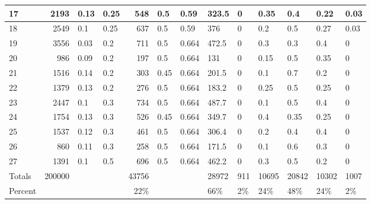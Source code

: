 \documentclass[12pt]{article}
\begin{document}
\begin{table}[H]
\begin{tabular}{ | l | r | l | l | r | l | l | l | l |l | l | l | l | }
17&2193&0.13&0.25&548&0.5&0.59&323.5&0&0.35&0.4&0.22&0.03 \\ \hline
18&2549&0.1&0.25&637&0.5&0.59&376&0&0.2&0.5&0.27&0.03 \\ \hline
19&3556&0.03&0.2&711&0.5&0.664&472.5&0&0.3&0.3&0.4&0 \\ \hline
20&986&0.09&0.2&197&0.5&0.664&131&0&0.15&0.5&0.35&0 \\ \hline
21&1516&0.14&0.2&303&0.45&0.664&201.5&0&0.1&0.7&0.2&0 \\ \hline
22&1379&0.13&0.2&276&0.5&0.664&183.2&0&0.25&0.5&0.25&0 \\ \hline
23&2447&0.1&0.3&734&0.5&0.664&487.7&0&0.1&0.5&0.4&0 \\ \hline
24&1754&0.13&0.3&526&0.45&0.664&349.7&0&0.4&0.35&0.25&0 \\ \hline
25&1537&0.12&0.3&461&0.5&0.664&306.4&0&0.2&0.4&0.4&0 \\ \hline
26&860&0.11&0.3&258&0.5&0.664&171.5&0&0.1&0.6&0.3&0 \\ \hline
27&1391&0.1&0.5&696&0.5&0.664&462.2&0&0.3&0.5&0.2&0 \\ \hline
Totals&200000&&&43756&&&28972&911&10695&20842&10302&1007 \\ \hline
Percent&&&&22\%&&&66\%&2\%&24\%&48\%&24\%&2\% \\ \hline
\end{tabular}
\end{table}
\end{document}
